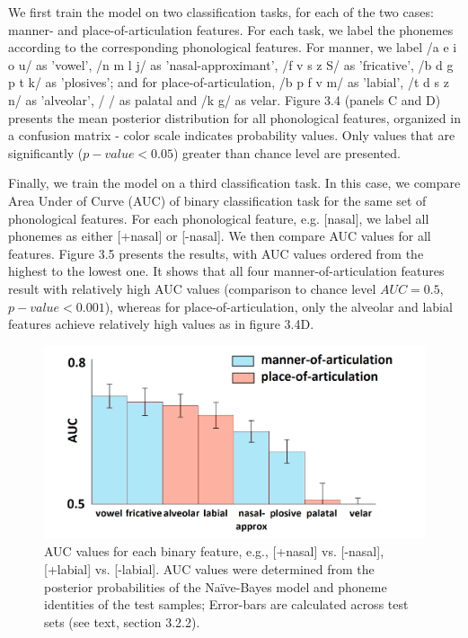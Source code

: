 We first train the model on two classification tasks, for each of the two cases: manner- and place-of-articulation features. For each task, we label the phonemes according to the corresponding phonological features. For manner, we label /a e i o u/ as 'vowel', /n m l j/ as 'nasal-approximant', /f v s z S/ as 'fricative', /b d g p t k/ as 'plosives'; and for place-of-articulation, /b p f v m/ as 'labial', /t d s z n/ as 'alveolar', / / as palatal and /k g/ as velar. Figure 3.4 (panels C and D) presents the mean posterior distribution for all phonological features, organized in a confusion matrix - color scale indicates probability values. Only values that are significantly ($p-value<0.05$) greater than chance level are presented. 

Finally, we train the model on a third classification task. In this case, we compare Area Under of Curve (AUC) of binary classification task for the same set of phonological features. For each phonological feature, e.g. [nasal], we label all phonemes as either [+nasal] or [-nasal]. We then compare AUC values for all features. Figure 3.5 presents the results, with AUC values ordered from the highest to the lowest one. It shows that all four manner-of-articulation features result with relatively high AUC values (comparison to chance level $AUC = 0.5$, $p-value<0.001$), whereas for place-of-articulation, only the alveolar and labial features achieve relatively high values as in figure 3.4D.

\begin{figure}[h]
\vspace{.3in}
\includegraphics[width=\linewidth]{Figures/Ch3/Figure5_new.png}
\caption{AUC values for each binary feature, e.g., [+nasal] vs. [-nasal], [+labial] vs. [-labial]. AUC values were determined from the posterior probabilities of the Na\"{i}ve-Bayes model and phoneme identities of the test samples; Error-bars are calculated across test sets (see text, section 3.2.2).}
\end{figure}

